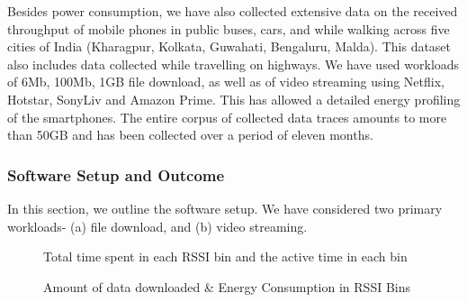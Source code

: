 \indent Besides power consumption, we have also collected extensive data on the received throughput of mobile phones in public buses, cars, and while walking across five cities of India (Kharagpur, Kolkata, Guwahati, Bengaluru, Malda). This dataset also includes data collected while travelling on highways. We have used workloads of 6Mb, 100Mb, 1GB file download, as well as of video streaming using Netflix, Hotstar, SonyLiv and Amazon Prime. This has allowed a detailed energy profiling of the smartphones. The entire corpus of collected data traces amounts to more than 50GB and has been collected over a period of eleven months. 
\subsubsection{Software Setup and Outcome}
\indent In this section, we outline the software setup. We have considered two primary workloads- (a) file download, and (b) video streaming. \\
\begin{figure}[h]
    \centering
    \caption{Total time spent in each \ac{RSSI} bin and the active time in each bin}
    \label{fig:chap03s3:vid_time}
\end{figure}
\begin{figure}[h]
    \centering
    \caption{Amount of data downloaded \& Energy Consumption in \ac{RSSI} Bins}
    \label{fig:chap03s3:vid_thpt}
\end{figure}
